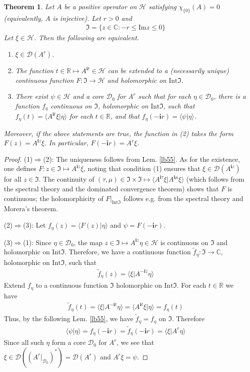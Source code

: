 \documentclass[12pt,b5paper,notitlepage]{article}
\theoremstyle{definition}
\theoremstyle{plain}
\newtheorem{thm}[df]{Theorem}
\newcommand{\fk}{\mathfrak}
\newcommand{\mc}{\mathcal}
\newcommand{\wtd}{\widetilde}
\newcommand{\ovl}{\overline}
\newcommand{\Dom}{\scr{D}}
\newcommand{\bk}[1]{\langle {#1}\rangle}
\newcommand{\scr}{\mathscr}
\newcommand{\im}{\mathbf{i}}
\newcommand{\Cbb}{\mathbb C}
\newcommand{\Rbb}{\mathbb R}
\newcommand{\Imag}{\mathrm{Im}}
\newcommand{\Int}{\mathrm{Int}}
\numberwithin{equation}{section}
\begin{document}
\begin{thm}\label{lb56}
Let $A$ be a positive operator on $\mc H$ satisfying $\chi_{\{0\}}(A)=0$ (equivalently, $A$ is injective). Let $r>0$ and 
\begin{align*}
\fk I=\{z\in\Cbb:-r\leq\Imag z\leq0\}
\end{align*}
Let $\xi\in\mc H$. Then the following are equivalent.
\begin{enumerate}[label=(\arabic*)]
\item $\xi\in\Dom(A^r)$.
\item The function $t\in\Rbb\mapsto A^{\im t}\in\mc H$ can be extended to a (necessarily unique) continuous function $F:\fk I\rightarrow\mc H$ and holomorphic on $\Int\fk I$.
\item There exist $\psi\in\mc H$ and a core $\Dom_0$ for $A^r$ such that for each $\eta\in\Dom_0$, there is a function $f_\eta$ continuous on $\fk I$, holomorphic on $\Int\fk I$, such that $f_\eta(t)=\bk{A^{\im t}\xi|\eta}$ for each $t\in\Rbb$, and that $f_\eta(-\im r)=\bk{\psi|\eta}$.
\end{enumerate}
Moreover, if the above statements are true, the function in (2) takes the form $F(z)=A^{\im z}\xi$. In particular, $F(-\im r)=A^r\xi$.
\end{thm}


\begin{proof}
(1)$\Rightarrow$(2): The uniqueness follows from Lem. \ref{lb55}. As for the existence, one defines $F:z\in\fk I\mapsto A^{\im z}\xi$, noting that condition (1) ensures that $\xi\in\Dom(A^{\im z})$ for all $z\in\fk I$. The continuity of $(\tau,\mu)\in\fk I\times\fk I\mapsto \bk{A^{\im\tau}\xi|A^{\im\mu}\xi}$ (which follows from the spectral theory and the dominated convergence theorem) shows that $F$ is continuous; the holomorphicity of $F|_{\Int\fk I}$ follows e.g. from the spectral theory and Morera's theorem.

(2)$\Rightarrow$(3): Let $f_\eta(z)=\bk{F(z)|\eta}$ and $\psi=F(-\im r)$.

(3)$\Rightarrow$(1): Since $\eta\in\Dom_0$, the map $z\in\fk I\mapsto A^{\im z}\eta\in\mc H$ is continuous on $\fk I$ and holomorphic on $\Int\fk I$. Therefore, we have a continuous function $\wtd f_\eta:\fk I\rightarrow\Cbb$, holomorphic on $\Int\fk I$, such that
\begin{align*}
\wtd f_\eta(z)=\bk{\xi|A^{-\im\ovl z}\eta}
\end{align*}
Extend $f_\eta$ to a continuous function $\fk I$ holomorphic on $\Int\fk I$. For each $t\in\Rbb$ we have
\begin{align*}
\wtd f_\eta(t)=\bk{\xi|A^{-\im t}\eta}=\bk{A^{\im t}\xi|\eta}=f_\eta(t)
\end{align*}
Thus, by the following Lem. \ref{lb55}, we have $\wtd f_\eta=f_\eta$ on $\fk I$. Therefore
\begin{align*}
\bk{\psi|\eta}=f_\eta(-\im r)=\wtd f_\eta(-\im r)=\bk{\xi|A^r\eta}
\end{align*}
Since all such $\eta$ form a core $\Dom_0$ for $A^r$, we see that $\xi\in\Dom((A^r|_{\Dom_0})^*)=\Dom(A^r)$ and $A^r\xi=\psi$.
\end{proof}
\end{document}
